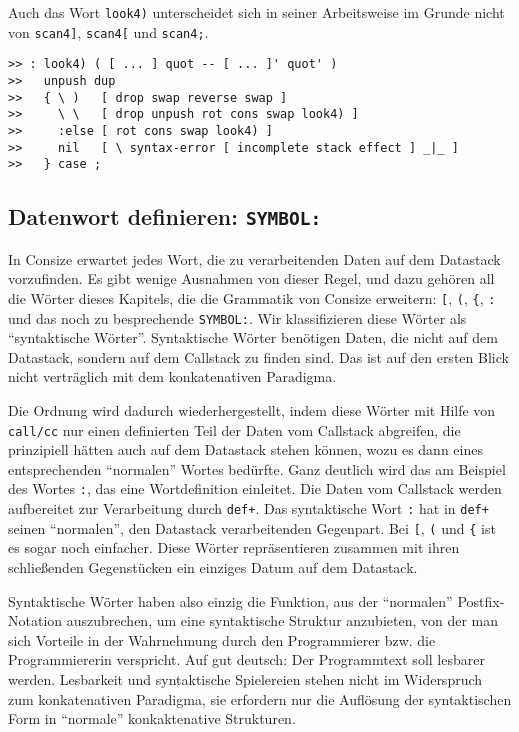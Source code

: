 Auch das Wort \verb|look4)| unterscheidet sich in seiner Arbeitsweise im Grunde nicht von \verb|scan4]|, \verb|scan4[| und \verb|scan4;|.

\begin{verbatim} 
>> : look4) ( [ ... ] quot -- [ ... ]' quot' )
>>   unpush dup
>>   { \ )   [ drop swap reverse swap ]
>>     \ \   [ drop unpush rot cons swap look4) ]
>>     :else [ rot cons swap look4) ]
>>     nil   [ \ syntax-error [ incomplete stack effect ] _|_ ]
>>   } case ;
\end{verbatim}
  
\subsection{Datenwort definieren: \texttt{SYMBOL:}}
\label{Sec:DefSymbols}

In Consize erwartet jedes Wort, die zu verarbeitenden Daten auf dem Datastack vorzufinden. Es gibt wenige Ausnahmen von dieser Regel, und dazu gehören all die Wörter dieses Kapitels, die die Grammatik von Consize erweitern: \verb|[|, \verb|(|, \verb|{|, \verb|:| und das noch zu besprechende \verb|SYMBOL:|. Wir klassifizieren diese Wörter als "`syntaktische Wörter"'. Syntaktische Wörter benötigen Daten, die nicht auf dem Datastack, sondern auf dem Callstack zu finden sind. Das ist auf den ersten Blick nicht verträglich mit dem konkatenativen Paradigma.

Die Ordnung wird dadurch wiederhergestellt, indem diese Wörter mit Hilfe von \verb|call/cc| nur einen definierten Teil der Daten vom Callstack abgreifen, die prinzipiell hätten auch auf dem Datastack stehen können, wozu es dann eines entsprechenden "`normalen"' Wortes bedürfte. Ganz deutlich wird das am Beispiel des Wortes \verb|:|, das eine Wortdefinition einleitet. Die Daten vom Callstack werden aufbereitet zur Verarbeitung durch \verb|def+|. Das syntaktische Wort \verb|:| hat in \verb|def+| seinen "`normalen"', den Datastack verarbeitenden Gegenpart. Bei \verb|[|, \verb|(| und \verb|{| ist es sogar noch einfacher. Diese Wörter repräsentieren zusammen mit ihren schließenden Gegenstücken ein einziges Datum auf dem Datastack.

Syntaktische Wörter haben also einzig die Funktion, aus der "`normalen"' Postfix-Notation auszubrechen, um eine syntaktische Struktur anzubieten, von der man sich Vorteile in der Wahrnehmung durch den Programmierer bzw. die Programmiererin verspricht. Auf gut deutsch: Der Programmtext soll lesbarer werden. Lesbarkeit und syntaktische Spielereien stehen nicht im Widerspruch zum konkatenativen Paradigma, sie erfordern nur die Auflösung der syntaktischen Form in "`normale"' konkaktenative Strukturen.

